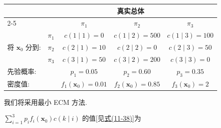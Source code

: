 \begin{mvtable}
\begin{tabular}{l|cccc}
\toprule
& \multicolumn{4}{c}{真实总体}\\
\cmidrule(lr){2-5}
& & $\pi_1$ & $\pi_2$ & $\pi_3$\\
\midrule
\multirow{3}{*}{将 $\mathbf{x}_0$ 分到:} & $\pi_1$ & $c(1\mid 1)=0$ & $c(1\mid 2)=500$ & $c(1\mid 3)=100$\\
& $\pi_2$ & $c(2\mid 1)=10$ & $c(2\mid 2)=0$ & $c(2\mid 3)=50$\\
& $\pi_3$ & $c(3\mid 1)=50$ & $c(3\mid 2)=200$ & $c(3\mid 3)=0$\\
\midrule
先验概率: & & $p_1=0.05$ & $p_2=0.60$ & $p_3=0.35$\\
密度值: & & $f_1(\mathbf{x}_0)=0.01$ & $f_2(\mathbf{x}_0)=0.85$ & $f_3(\mathbf{x}_0)=2$\\
\bottomrule
\end{tabular}
\end{mvtable}

我们将采用最小 ECM 方法.

$\sum_{i=1}^{3}p_if_i(\mathbf{x}_0)c(k\mid i)$ 的值[见\hyperref[eq:11-38]{式(11-38)}]为
